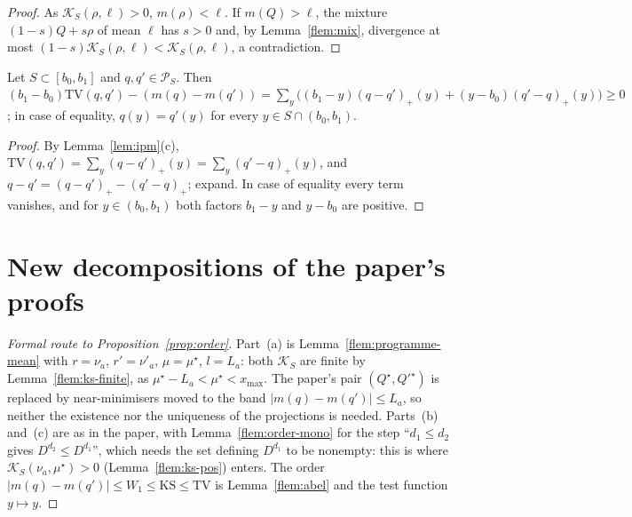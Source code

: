 \documentclass[11pt]{article}
\newcommand{\xmax}{x_{\max}}
\newcommand{\Simp}{\mathcal{P}_{S}}
\newcommand{\mean}{m}
\newcommand{\TV}{\mathrm{TV}}
\newcommand{\Ks}{\mathcal{K}_{S}}
\newcommand{\Wone}{W_{1}}
\begin{document}
\begin{proof}
As $\Ks(\rho,\ell)>0$, $\mean(\rho)<\ell$. If $\mean(Q)>\ell$, the mixture $(1-s)Q+s\rho$ of mean $\ell$
has $s>0$ and, by Lemma~\ref{flem:mix}, divergence at most $(1-s)\Ks(\rho,\ell)<\Ks(\rho,\ell)$, a
contradiction.
\end{proof}

\begin{lemma}\label{flem:tv-width}
Let $S\subset[b_0,b_1]$ and $q,q'\in\Simp$. Then
$(b_1-b_0)\TV(q,q')-(\mean(q)-\mean(q'))=\sum_y\big((b_1-y)(q-q')_+(y)+(y-b_0)(q'-q)_+(y)\big)\ge0$; in
case of equality, $q(y)=q'(y)$ for every $y\in S\cap(b_0,b_1)$.
\end{lemma}

\begin{proof}
By Lemma~\ref{lem:ipm}(c), $\TV(q,q')=\sum_y(q-q')_+(y)=\sum_y(q'-q)_+(y)$, and
$q-q'=(q-q')_+-(q'-q)_+$; expand. In case of equality every term vanishes, and for $y\in(b_0,b_1)$
both factors $b_1-y$ and $y-b_0$ are positive.
\end{proof}

\section{New decompositions of the paper's proofs}

\begin{proof}[Formal route to Proposition~\ref{prop:order}]
Part~(a) is Lemma~\ref{flem:programme-mean} with $r=\nu_a$, $r'=\nu'_a$, $\mu=\mu^\star$, $l=L_a$:
both $\Ks$ are finite by Lemma~\ref{flem:ks-finite}, as $\mu^\star-L_a<\mu^\star<\xmax$. The paper's
pair $(Q^\star,Q'^\star)$ is replaced by near-minimisers moved to the band
$|\mean(q)-\mean(q')|\le L_a$, so neither the existence nor the uniqueness of the projections is
needed. Parts~(b) and~(c) are as in the paper, with Lemma~\ref{flem:order-mono} for the step
``$d_1\le d_2$ gives $D^{d_2}\le D^{d_1}$'', which needs the set defining $D^{d_1}$ to be nonempty:
this is where $\Ks(\nu_a,\mu^\star)>0$ (Lemma~\ref{flem:ks-pos}) enters. The order
$|\mean(q)-\mean(q')|\le\Wone\le\mathrm{KS}\le\TV$ is Lemma~\ref{flem:abel} and the test function
$y\mapsto y$.
\end{proof}
\end{document}
